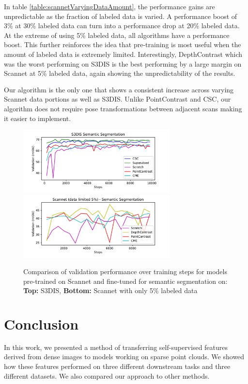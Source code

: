\documentclass[10pt,twocolumn,letterpaper]{article}
\begin{document}
In table \ref{table:scannetVaryingDataAmount}, the performance gains are unpredictable as the fraction of labeled data is varied. A performance boost of 3\% at 30\% labeled data can turn into a performance drop at 20\% labeled data. At the extreme of using 5\% labeled data, all algorithms have a performance boost. This further reinforces the idea that pre-training is most useful when the amount of labeled data is extremely limited. Interestingly, DepthContrast which was the worst performing on S3DIS is the best performing by a large margin on Scannet at 5\% labeled data, again showing the unpredictability of the results.

Our algorithm is the only one that shows a consistent increase across varying Scannet data portions as well as S3DIS. Unlike PointContrast and CSC, our algorithm does not require pose transformations between adjacent scans making it easier to implement.

\begin{figure}
    \centering
    \includegraphics[width=8cm]{images/plots/s3dis_semantic.pdf}
    \includegraphics[width=8cm]{images/plots/scannet_0.05_semantic.pdf}
    \caption{Comparison of validation performance over training steps for models pre-trained on Scannet and fine-tuned for semantic segmentation on: \textbf{Top:} S3DIS, \textbf{Bottom:} Scannet with only 5\% labeled data}
    \label{fig:validationComparison}
\end{figure}

\section{Conclusion}
\label{sec:conclusion}

In this work, we presented a method of transferring self-supervised features derived from dense images to models working on sparse point clouds. We showed how these features performed on three different downstream tasks and three different datasets. We also compared our approach to other methods.
\end{document}
